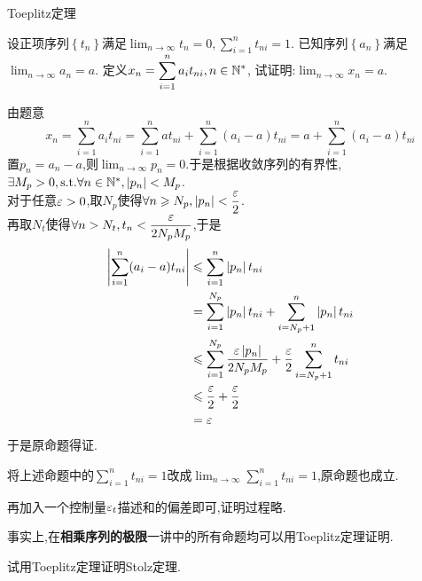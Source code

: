 \documentclass{ctexart}
\begin{document}
\pagestyle{empty}
\begin{center}\large Toeplitz定理\end{center}
\begin{formal}[Toeplitz定理]
    设正项序列$\left\{t_n\right\}$满足$\displaystyle\lim_{n\to\infty}t_n=0,\sum_{i=1}^{n}t_{ni}=1$.
    已知序列$\left\{a_n\right\}$满足$\displaystyle\lim_{n\to\infty}a_n=a$.
    定义$\displaystyle x_n=\sum_{i=1}^{n}a_it_{ni},n\in\mathbb{N}^*$,
    试证明:$\displaystyle\lim_{n\to\infty}x_n=a$.
\end{formal}
\begin{solution}[Proof]
    由题意
    $$x_n=\sum_{i=1}^{n}a_it_{ni}=\sum_{i=1}^{n}at_{ni}+\sum_{i=1}^{n}(a_i-a)t_{ni}=a+\sum_{i=1}^{n}(a_i-a)t_{ni}$$
    置$p_n=a_n-a$,则$\displaystyle\lim_{n\to\infty}p_n=0$.于是根据收敛序列的有界性,$\exists M_p>0,\text{s.t.}\forall n\in\mathbb{N}^*,\left|p_n\right|<M_p$.\\
    对于任意$\varepsilon>0$,取$N_p$使得$\forall n\geqslant N_p,\left|p_n\right|<\dfrac{\varepsilon}{2}$.\\
    再取$N_t$使得$\forall n>N_t,t_n<\dfrac{\varepsilon}{2N_pM_p}$,于是
    $$\begin{aligned}
        \left|\sum_{i=1}^{n}(a_i-a)t_{ni}\right|
        &\leqslant \sum_{i=1}^{n}\left|p_n\right|t_{ni} \\
        &= \sum_{i=1}^{N_p}\left|p_n\right|t_{ni}+\sum_{i=N_p+1}^{n}\left|p_n\right|t_{ni} \\
        &\leqslant \sum_{i=1}^{N_p}\dfrac{\varepsilon\left|p_n\right|}{2N_pM_p}+\dfrac{\varepsilon}{2}\sum_{i=N_p+1}^{n}t_{ni} \\
        &\leqslant \dfrac{\varepsilon}{2}+\dfrac{\varepsilon}{2} \\
        &= \varepsilon
    \end{aligned}$$
    于是原命题得证.
\end{solution}
\begin{theorem}
    将上述命题中的$\displaystyle\sum_{i=1}^{n}t_{ni}=1$改成$\displaystyle\lim_{n\to\infty}\sum_{i=1}^{n}t_{ni}=1$,原命题也成立.
\end{theorem}
\begin{analyze}[Analysis.]
    再加入一个控制量$\varepsilon_t$描述和的偏差即可,证明过程略.
\end{analyze}\noindent
事实上,在\textbf{\songti 相乘序列的极限}一讲中的所有命题均可以用Toeplitz定理证明.
\begin{problem}[Problem.]
    试用Toeplitz定理证明Stolz定理.
\end{problem}
\end{document}
